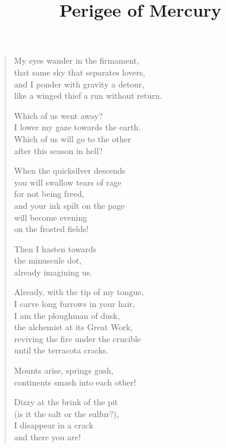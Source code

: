 \documentclass[twocolumn,11pt]{article}
\title{Perigee of Mercury}
\author{}
\date{}
\begin{document}
\maketitle

\thispagestyle{empty}



\bigskip

\begin{verse}%
  My eyes wander in the firmament, \\
  that same sky that separates lovers, \\
  and I ponder with gravity a detour, \\
  like a winged thief a run without return.

  Which of us went away? \\
  I lower my gaze towards the earth. \\
  Which of us will go to the other \\
  after this season in hell?

  When the quicksilver descends \\
  you will swallow tears of rage \\
  for not being freed, \\
  and your ink spilt on the page \\
  will become evening \\
  on the frosted fields!

  Then I hasten towards \\
  the minuscule dot, \\
  already imagining us.

  Already, with the tip of my tongue, \\
  I carve long furrows in your hair, \\
  I am the ploughman of dusk, \\
  the alchemist at its Great Work, \\
  reviving the fire under the crucible \\
  until the terracota cracks.

  \newpage

  Mounts arise, springs gush, \\
  continents smash into each other!

  Dizzy at the brink of the pit \\
  (is it the salt or the sulfur?), \\
  I disappear in a crack \\
  and there you are!


\end{verse}
\end{document}
